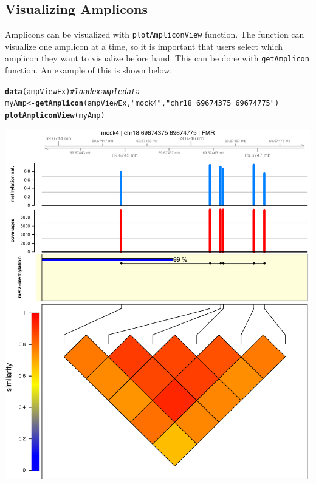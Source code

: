 \documentclass{article}\usepackage[]{graphicx}\usepackage[]{color}
\makeatletter
\newcommand{\hlstr}[1]{\textcolor[rgb]{0.192,0.494,0.8}{#1}}%
\newcommand{\hlcom}[1]{\textcolor[rgb]{0.678,0.584,0.686}{\textit{#1}}}%
\newcommand{\hlstd}[1]{\textcolor[rgb]{0.345,0.345,0.345}{#1}}%
\newcommand{\hlkwb}[1]{\textcolor[rgb]{0.69,0.353,0.396}{#1}}%
\newcommand{\hlkwd}[1]{\textcolor[rgb]{0.737,0.353,0.396}{\textbf{#1}}}%
\newenvironment{kframe}{%
 \def\at@end@of@kframe{}%
 \ifinner\ifhmode%
  \def\at@end@of@kframe{\end{minipage}}%
  \begin{minipage}{\columnwidth}%
 \fi\fi%
 \def\FrameCommand##1{\hskip\@totalleftmargin \hskip-\fboxsep
 \colorbox{shadecolor}{##1}\hskip-\fboxsep
     \hskip-\linewidth \hskip-\@totalleftmargin \hskip\columnwidth}%
 \MakeFramed {\advance\hsize-\width
   \@totalleftmargin\z@ \linewidth\hsize
   \@setminipage}}%
 {\par\unskip\endMakeFramed%
 \at@end@of@kframe}
\newenvironment{knitrout}{}{} %
\makeatother
\begin{document}
\subsection{Visualizing Amplicons}
Amplicons can be visualized with \texttt{plotAmpliconView} function. The function
can visualize one amplicon at a time, so it is important that users select which 
amplicon they want to visualize before hand. This can be done with \texttt{getAmplicon} function.
An example of this is shown below.
\begin{knitrout}
\color{fgcolor}\begin{kframe}
\begin{alltt}
\hlkwd{data}\hlstd{(ampViewEx)}  \hlcom{# load example data}
\hlstd{myAmp} \hlkwb{<-} \hlkwd{getAmplicon}\hlstd{(ampViewEx,} \hlstr{"mock4"}\hlstd{,} \hlstr{"chr18_69674375_69674775"}\hlstd{)}
\hlkwd{plotAmpliconView}\hlstd{(myAmp)}
\end{alltt}
\end{kframe}

{\centering \includegraphics[width=.9\linewidth]{figure/manual-plotAmp} 

}



\end{knitrout}
\end{document}
